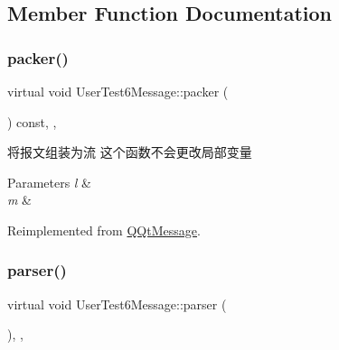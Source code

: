 \subsection{Member Function Documentation}
\mbox{\label{class_user_test6_message_a9117765e40ea9be61de4d4c3da8528dc}} 
\subsubsection{\texorpdfstring{packer()}{packer()}}
{\footnotesize\ttfamily virtual void User\+Test6\+Message\+::packer (\begin{DoxyParamCaption}\item[{Q\+Byte\+Array \&}]{ }\end{DoxyParamCaption}) const\hspace{0.3cm}{\ttfamily [inline]}, {\ttfamily [override]}, {\ttfamily [virtual]}}



将报文组装为流 这个函数不会更改局部变量 


\begin{DoxyParams}{Parameters}
{\em l} & \\
\hline
{\em m} & \\
\hline
\end{DoxyParams}


Reimplemented from \mbox{\hyperlink{class_q_qt_message_af1885c2c3628495808dca66ee8d72e14}{Q\+Qt\+Message}}.

\mbox{\label{class_user_test6_message_a1b55b1134b2a0ccfc8d5093aa86de694}} 
\subsubsection{\texorpdfstring{parser()}{parser()}}
{\footnotesize\ttfamily virtual void User\+Test6\+Message\+::parser (\begin{DoxyParamCaption}\item[{const Q\+Byte\+Array \&}]{ }\end{DoxyParamCaption})\hspace{0.3cm}{\ttfamily [inline]}, {\ttfamily [override]}, {\ttfamily [virtual]}}



